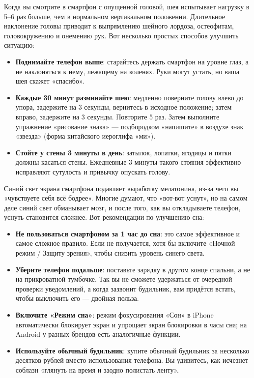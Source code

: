 
Когда вы смотрите в смартфон с опущенной головой, шея испытывает нагрузку в 5–6 раз больше, чем в нормальном вертикальном положении. Длительное наклонение головы приводит к выпрямлению шейного лордоза, остеофитам, головокружению и онемению рук. Вот несколько простых способов улучшить ситуацию:

\begin{itemize}
  \item \textbf{Поднимайте телефон выше}: старайтесь держать смартфон на уровне глаз, а не наклоняться к нему, лежащему на коленях. Руки могут устать, но ваша шея скажет «спасибо».
  \item \textbf{Каждые 30 минут разминайте шею}: медленно поверните голову влево до упора, задержите на 3 секунды, вернитесь в исходное положение; затем вправо, задержите на 3 секунды. Повторите 5 раз. Затем выполните упражнение «рисование знака» — подбородком «напишите» в воздухе знак «звезда» (форма китайского иероглифа «ми»).
  \item \textbf{Стойте у стены 3 минуты в день}: затылок, лопатки, ягодицы и пятки должны касаться стены. Ежедневные 3 минуты такого стояния эффективно исправляют сутулость и привычку опускать голову.
\end{itemize}


Синий свет экрана смартфона подавляет выработку мелатонина, из-за чего вы «чувствуете себя всё бодрее». Многие думают, что «вот-вот уснут», но на самом деле синий свет обманывает мозг, и после того, как вы откладываете телефон, уснуть становится сложнее. Вот рекомендации по улучшению сна:

\begin{itemize}
  \item \textbf{Не пользоваться смартфоном за 1 час до сна}: это самое эффективное и самое сложное правило. Если не получается, хотя бы включите «Ночной режим / Защиту зрения», чтобы снизить уровень синего света.
  \item \textbf{Уберите телефон подальше}: поставьте зарядку в другом конце спальни, а не на прикроватной тумбочке. Так вы не сможете удержаться от очередной проверки уведомлений, а когда зазвонит будильник, вам придётся встать, чтобы выключить его — двойная польза.
  \item \textbf{Включите «Режим сна»}: режим фокусирования «Сон» в iPhone автоматически блокирует экран и упрощает экран блокировки в часы сна; на Android у разных брендов есть аналогичные функции.
  \item \textbf{Используйте обычный будильник}: купите обычный будильник за несколько десятков рублей вместо использования телефона. Вы удивитесь, как исчезнет соблазн «глянуть на время и заодно полистать ленту».
\end{itemize}


